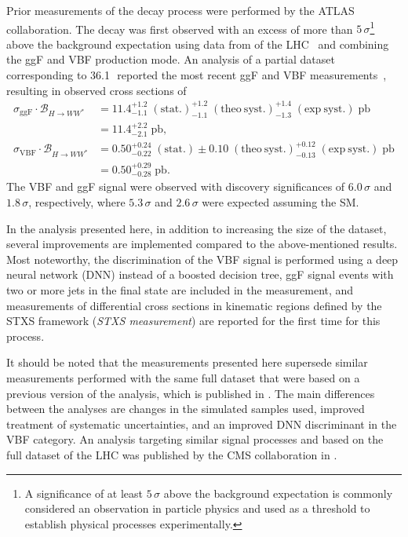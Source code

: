 Prior measurements of the \HWW decay process were performed by the ATLAS collaboration.
The \HWW decay was first observed with an excess of more than $5\,\sigma$\footnote{A significance of at least $5\,\sigma$ above the background expectation is commonly considered an observation in particle physics and used as a threshold to establish physical processes experimentally.} above the background expectation using data from \RunOne of the LHC~\cite{HIGG-2013-13} and combining the ggF and VBF production mode. An analysis of a partial \RunTwo dataset corresponding to 36.1\,\ifb\ reported the most recent ggF and VBF \HWW measurements~\cite{HIGG-2013-13}, resulting in observed cross sections of
\begin{align}
    \label{eq:xsec:prev-run2-results}
    \sigma_{\mathrm{ggF}} \cdot \mathcal{B}_{H \to WW^{\ast}} & = 11.4^{+1.2}_{-1.1}\;(\mathrm{stat.}) ^{+1.2}_{-1.1}\;(\mathrm{theo~ syst.}) ^{+1.4}_{-1.3}\;(\mathrm{exp~ syst.})\;\mathrm{pb}  \\
                                                              & = 11.4 ^{+2.2}_{-2.1}\;\mathrm{pb}, \\
    \sigma_{\mathrm{VBF}} \cdot \mathcal{B}_{H \to WW^{\ast}} & = 0.50 ^{+0.24}_{-0.22}\;(\mathrm{stat.}) \pm 0.10\;(\mathrm{theo~ syst.}) ^{+0.12}_{-0.13}\;(\mathrm{exp~ syst.})\;\mathrm{pb} \\
                                                              & = 0.50 ^{+0.29}_{-0.28}\;\mathrm{pb}.
\end{align}
The VBF and ggF signal were observed with discovery significances of $6.0\,\sigma$ and $1.8\,\sigma$, respectively, where $5.3\,\sigma$ and $2.6\,\sigma$ were expected assuming the SM.

In the analysis presented here, in addition to increasing the size of the dataset, several improvements are implemented compared to the above-mentioned results.
Most noteworthy, the discrimination of the VBF signal is performed using a deep neural network (DNN) instead of a boosted decision tree, ggF signal events with two or more jets in the final state are included in the measurement, and measurements of differential cross sections in kinematic regions defined by the STXS framework (\emph{STXS measurement}) are reported for the first time for this process.

It should be noted that the measurements presented here supersede similar measurements performed with the same full \RunTwo dataset that were based on a previous version of the analysis, which is published in .
The main differences between the analyses are changes in the simulated samples used, improved treatment of systematic uncertainties, and an improved DNN discriminant in the VBF category.
An analysis targeting similar signal processes and based on the full \RunTwo dataset of the LHC was published by the CMS collaboration in .
